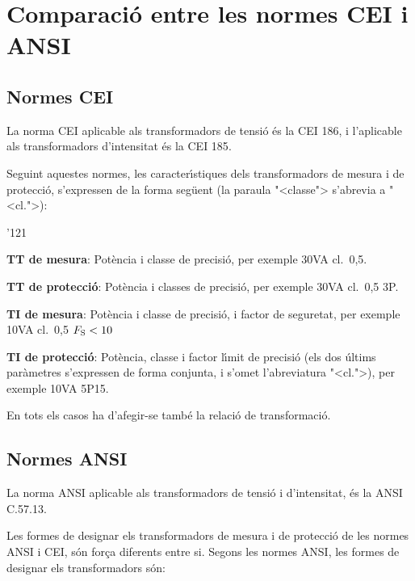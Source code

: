 \section{Comparaci\'{o} entre les normes CEI i
ANSI}\label{sec:comp_tt_ti_cei_ansi}

\subsection{Normes CEI}

La norma \textsf{CEI} aplicable als transformadors de tensi\'{o} \'{e}s la
\textsf{CEI 186}, i l'aplicable als transformadors
d'intensitat \'{e}s la \textsf{CEI 185}.

Seguint aquestes normes, les caracter\'{\i}stiques dels transformadors de
mesura i de protecci\'{o}, s'expressen de la forma seg\"{u}ent (la paraula
{"<}classe{">} s'abrevia a {"<}cl.{">}):
\begin{dinglist}{'121}
   \item \textbf{TT de mesura}: Pot\`{e}ncia i classe de precisi\'{o}, per
   exemple 30\unit{VA} cl.~0,5.
   \item \textbf{TT de protecci\'{o}}: Pot\`{e}ncia i classes de precisi\'{o}, per
   exemple 30\unit{VA} cl.~0,5 3P.
   \item \textbf{TI de mesura}: Pot\`{e}ncia i classe de precisi\'{o}, i factor de seguretat, per
   exemple 10\unit{VA} cl.~0,5 $F_\mathrm{S}<10$
   \item \textbf{TI de protecci\'{o}}: Pot\`{e}ncia, classe i factor l\'{\i}mit de precisi\'{o}
    (els dos \'{u}ltims par\`{a}metres s'expressen de forma conjunta, i s'omet l'abreviatura {"<}cl.{">}),
     per exemple 10\unit{VA} 5P15.
\end{dinglist}

En tots els casos ha d'afegir-se tamb\'{e} la relaci\'{o} de transformaci\'{o}.

\subsection{Normes ANSI}

La norma \textsf{ANSI} aplicable als transformadors de tensi\'{o} i
d'intensitat, \'{e}s la \textsf{ANSI C.57.13}.

Les formes de designar els transformadors  de mesura i de protecci\'{o}
de les normes \textsf{ANSI} i \textsf{CEI}, s\'{o}n for\c{c}a diferents
entre si. Segons les normes \textsf{ANSI},  les formes de designar
els transformadors s\'{o}n:

